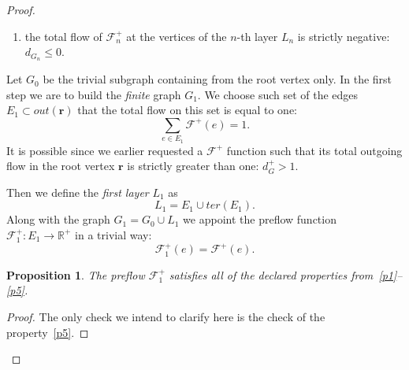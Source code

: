 \documentclass[12pt]{article}
\renewcommand{\leq}{\leqslant}
\newtheorem{prop}{Proposition}
\theoremstyle{definition}
\newcommand{\flowpos}{\mathcal{F}^{+}}
\newcommand{\flowposn}[1]{\mathcal{F}_{#1}^{+}}
\newcommand{\ter}{ter}
\newcommand{\eout}{out}
\renewcommand{\root}{\mathbf{r}}
\numberwithin{remark}{section}
\numberwithin{theorem}{section}
\numberwithin{prop}{section}
\numberwithin{equation}{section}
\numberwithin{lemma}{section}
\numberwithin{prop_under_lemma}{lemma}
\begin{document}
\begin{proof}
\begin{enumerate}[label=\textbf{P\arabic*}]
          \item \label{p5} the total flow of $\flowposn{n}$ at the vertices of the $n$-th layer $L_n$ is strictly negative: $d_{G_n} \leq 0$.
        \end{enumerate}
      Let $G_0$ be the trivial subgraph containing from the root vertex only.
      In the first step we are to build the \emph{finite} graph $G_1$.
      We choose such set of the edges $E_1 \subset \eout(\root)$ that the total flow on this set is equal to one:
      \[
        \sum_{e \in E_1} \flowpos(e) = 1.
      \]
      It is possible since we earlier requested a $\flowpos$ function such that its total outgoing flow in the root vertex
        $\root$ is strictly greater than one: $d^{+}_{G} > 1$.

      Then we define the \emph{first layer} $L_1$ as
      \[
        L_1 = E_1 \cup \ter(E_1).
      \]
      Along with the graph $G_1 = G_0 \cup L_1$ we appoint the preflow function $\flowposn{1}: E_1 \to \mathbb{R}^{+}$ in a trivial way:
      \[
        \flowposn{1}(e) = \flowpos(e).
      \]
      \begin{prop}
        The preflow $\flowposn{1}$ satisfies all of the declared properties from~\ref{p1}--\ref{p5}.
      \end{prop}
      \begin{proof}
        The only check we intend to clarify here is the check of the property~\ref{p5}.


\end{proof}
\end{proof}
\end{document}
